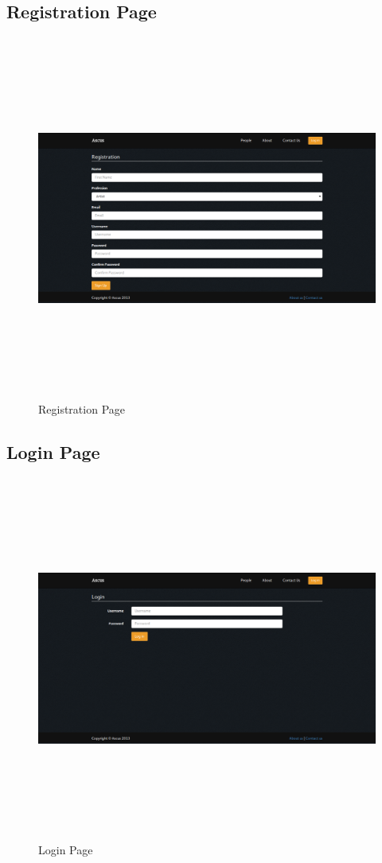 \documentclass[a4paper,oneside,11pt]{report}
\begin{document}
\begin{appendices}
\subsection{Registration Page}
\begin{figure}[!ht]
\centering
\includegraphics[width=\textwidth,height=12cm,keepaspectratio]{appendix/third-iteration-full-registration-page.png}
\caption{Registration Page}
\end{figure}

\subsection{Login Page}
\begin{figure}[!ht]
\centering
\includegraphics[width=\textwidth,height=12cm,keepaspectratio]{appendix/third-iteration-full-login-page.png}
\caption{Login Page}
\end{figure}



\end{appendices}
\end{document}
